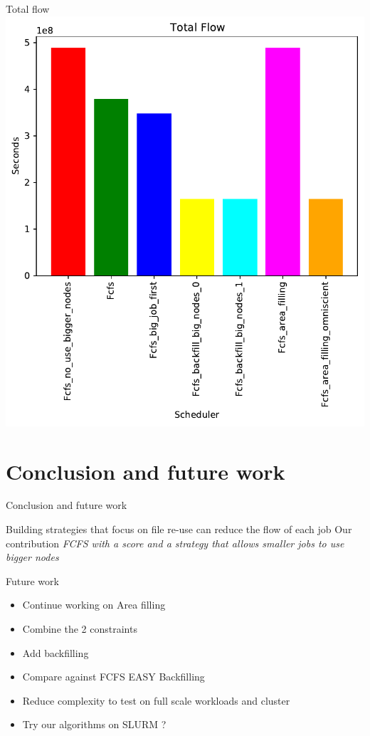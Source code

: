 \documentclass{libs/ufc_format}
\begin{document}
{\begin{frame}{Total flow}
	\center\includegraphics[scale=0.48]{../MBSS/plot/Size_Constraint_2022-02-08->2022-02-08_very_reduced_Total_flow_95_128_4_256_1_1024.pdf}
\end{frame}


\section{Conclusion and future work}
\begin{frame}{Conclusion and future work}
	\begin{block}{Building strategies that focus on file re-use can reduce the flow of each job}
		Our contribution \MVRightarrow{}
		\emph{FCFS with a score and a strategy that allows smaller jobs to use bigger nodes}
	\end{block}

	\begin{exampleblock}{Future work}
		\begin{itemize}
			\item Continue working on Area filling
			\item Combine the 2 constraints
			\item Add backfilling
			\item Compare against FCFS EASY Backfilling
			\item Reduce complexity to test on full scale workloads and cluster
			\item Try our algorithms on SLURM ?
		\end{itemize}
	\end{exampleblock}
\end{frame}

}
\end{document}
